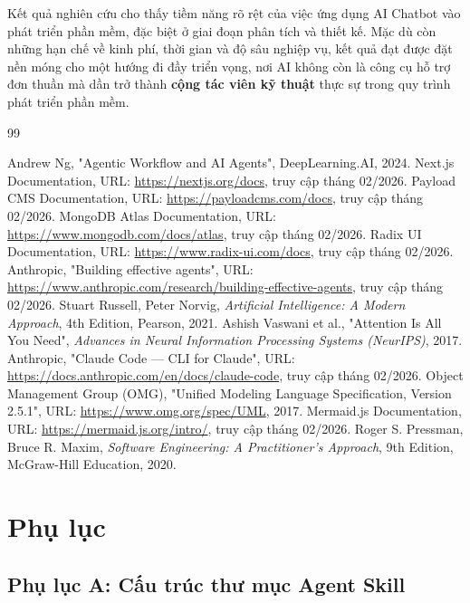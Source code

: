 \documentclass[13pt,a4paper,oneside]{extreport}
\numberwithin{equation}{chapter}
\numberwithin{figure}{chapter}
\numberwithin{table}{chapter}
\begin{document}
Kết quả nghiên cứu cho thấy tiềm năng rõ rệt của việc ứng dụng AI Chatbot vào phát triển phần mềm, đặc biệt ở giai đoạn phân tích và thiết kế. Mặc dù còn những hạn chế về kinh phí, thời gian và độ sâu nghiệp vụ, kết quả đạt được đặt nền móng cho một hướng đi đầy triển vọng, nơi AI không còn là công cụ hỗ trợ đơn thuần mà dần trở thành \textbf{cộng tác viên kỹ thuật} thực sự trong quy trình phát triển phần mềm.

\begin{thebibliography}{99}
   Andrew Ng, "Agentic Workflow and AI Agents", DeepLearning.AI, 2024.
   Next.js Documentation, URL: \url{https://nextjs.org/docs}, truy cập tháng 02/2026.
   Payload CMS Documentation, URL: \url{https://payloadcms.com/docs}, truy cập tháng 02/2026.
   MongoDB Atlas Documentation, URL: \url{https://www.mongodb.com/docs/atlas}, truy cập tháng 02/2026.
   Radix UI Documentation, URL: \url{https://www.radix-ui.com/docs}, truy cập tháng 02/2026.
   Anthropic, "Building effective agents", URL: \url{https://www.anthropic.com/research/building-effective-agents}, truy cập tháng 02/2026.
   Stuart Russell, Peter Norvig, \textit{Artificial Intelligence: A Modern Approach}, 4th Edition, Pearson, 2021.
   Ashish Vaswani et al., "Attention Is All You Need", \textit{Advances in Neural Information Processing Systems (NeurIPS)}, 2017.
   Anthropic, "Claude Code — CLI for Claude", URL: \url{https://docs.anthropic.com/en/docs/claude-code}, truy cập tháng 02/2026.
   Object Management Group (OMG), "Unified Modeling Language Specification, Version 2.5.1", URL: \url{https://www.omg.org/spec/UML}, 2017.
   Mermaid.js Documentation, URL: \url{https://mermaid.js.org/intro/}, truy cập tháng 02/2026.
   Roger S. Pressman, Bruce R. Maxim, \textit{Software Engineering: A Practitioner's Approach}, 9th Edition, McGraw-Hill Education, 2020.
\end{thebibliography}

\appendix
\chapter*{Phụ lục}

\section{Phụ lục A: Cấu trúc thư mục Agent Skill}
\end{document}
